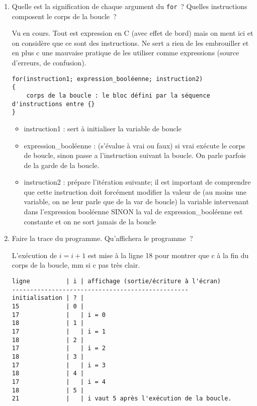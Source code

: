 \begin{enumerate}
\item Quelle est la signification de chaque argument du \verb|for|~?
  Quelles instructions composent le corps de la boucle~?
  \begin{correction}
    Vu en cours. Tout est expression en C (avec effet de bord) mais on
    ment ici et on considère que ce sont des instructions. Ne sert a
    rien de les embrouiller et en plus c une mauvaise pratique de les
    utiliser comme expressions (source d'erreurs, de confusion).
\begin{verbatim}
for(instruction1; expression_booléenne; instruction2)
{
    corps de la boucle : le bloc défini par la séquence d'instructions entre {}
}
\end{verbatim}
    \begin{itemize}
    \item instruction1 : sert à initialiser la variable de boucle

    \item expression\_booléenne : (s'évalue à vrai ou faux) si vrai
      exécute le corps de boucle, sinon passe a l'instruction suivant
      la boucle. On parle parfois de la garde de la boucle.

    \item instruction2 : prépare l'itération suivante; il est
      important de comprendre que cette instruction doit forcément
      modifier la valeur de (au moins une variable, on ne leur parle
      que de la var de boucle) la variable intervenant dans
      l'expression booléenne SINON la val de expression\_booléenne est
      constante et on ne sort jamais de la boucle
    \end{itemize}
  \end{correction}
\item Faire la trace du programme. Qu'affichera le programme~?

\begin{correction}
L'exécution de $i = i + 1$ est mise à la ligne 18 pour montrer que c à
la fin du corps de la boucle, mm si c pas très clair.
\begin{verbatim}
ligne          | i | affichage (sortie/écriture à l'écran)
-------------------------------------------------
initialisation | ? |
15             | 0 |
17             |   | i = 0
18             | 1 |
17             |   | i = 1
18             | 2 |
17             |   | i = 2
18             | 3 |
17             |   | i = 3
18             | 4 |
17             |   | i = 4
18             | 5 |
21             |   | i vaut 5 après l'exécution de la boucle.
\end{verbatim}


\end{correction}
\end{enumerate}
